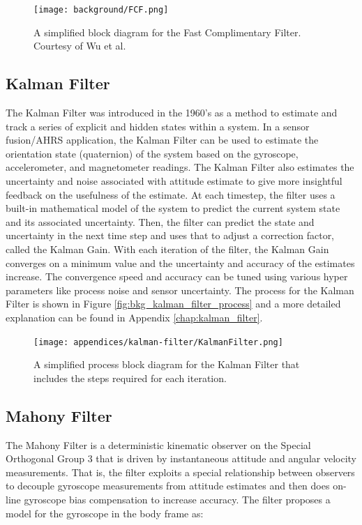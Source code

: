 \begin{figure}
    \centering
    \caption[Fast Complimentary Filter]{A simplified block diagram for the Fast Complimentary Filter. 
    Courtesy of Wu et al. \cite{FCF:2016}}
    \texttt{[image: background/FCF.png]}
\end{figure}

\subsection{Kalman Filter} 
The Kalman Filter \cite{Kalman:1960} was introduced in the 1960's as a method to estimate and track a series of explicit and hidden states within a system.
In a sensor fusion/AHRS application, the Kalman Filter can be used to estimate the orientation state (quaternion) of the system based on the gyroscope, accelerometer, and magnetometer readings.
The Kalman Filter also estimates the uncertainty and noise associated with attitude estimate to give more insightful feedback on the usefulness of the estimate.
At each timestep, the filter uses a built-in mathematical model of the system to predict the current system state and its associated uncertainty.
Then, the filter can predict the state and uncertainty in the next time step and uses that to adjust a correction factor, called the Kalman Gain.
With each iteration of the filter, the Kalman Gain converges on a minimum value and the uncertainty and accuracy of the estimates increase.
The convergence speed and accuracy can be tuned using various hyper parameters like process noise and sensor uncertainty.
The process for the Kalman Filter is shown in Figure \ref{fig:bkg_kalman_filter_process} and a more detailed explanation can be found in Appendix \ref{chap:kalman_filter}.

\begin{figure}
    \centering
    \caption[Kalman Filter Process]{A simplified process block diagram for the Kalman Filter that includes the steps required for each iteration.}
    \texttt{[image: appendices/kalman-filter/KalmanFilter.png]}
\end{figure}

\subsection{Mahony Filter} 
The Mahony Filter \cite{Mahony:2008} is a deterministic kinematic observer on the Special Orthogonal Group 3 that is driven by instantaneous attitude and angular velocity measurements.
That is, the filter exploits a special relationship between observers to decouple gyroscope measurements from attitude estimates and then does on-line gyroscope bias compensation to increase accuracy.
The filter proposes a model for the gyroscope in the body frame as:


